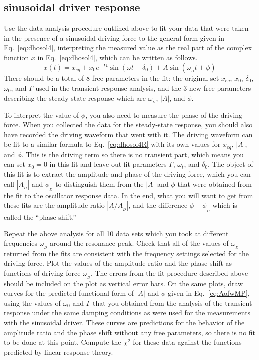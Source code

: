 \documentclass{revtex4}
\begin{document}
\subsection{sinusoidal driver response}

Use the data analysis procedure outlined above to fit your data that
were taken in the presence of a sinusoidal driving force to the general
form given in Eq.~\ref{eq:dhosol4}, interpreting the measured value as the
real part of the complex function $x$ in Eq.~\ref{eq:dhosol4}, which can
be written as follows.
\begin{equation}
x(t) = x_{eq} + x_0 e^{-\Gamma t} \sin(\omega t + \delta_0) 
              + A \sin(\omega_{_D} t + \phi)
\label{eq:dhosol4R}
\end{equation}
There should be a total of 8 free parameters in the fit: the original
set $x_{eq}$, $x_0$, $\delta_0$, $\omega_0$, and $\Gamma$ used in the
transient response analysis, and the 3 new free parameters describing
the steady-state response which are $\omega_{_D}$, $|A|$, and $\phi$.

To interpret the value of $\phi$, you also need to measure the phase
of the driving force. When you collected the data for the steady-state
response, you should also have recorded the driving waveform that went
with it. The driving waveform can be fit to a similar formula to
Eq.~\ref{eq:dhosol4R} with its own values for $x_{eq}$, $|A|$, and $\phi$.
This is the driving term so there is no transient part, which means
you can set $x_0=0$ in this fit and leave out fit parameters $\Gamma$,
$\omega_t$, and $\delta_0$.  The object of this fit is to extract the 
amplitude and phase of the driving force, which you can call $|A_{_D}|$
and $\phi_{_D}$ to distinguish them from the $|A|$ and $\phi$ that were
obtained from the fit to the oscillator response data. In the end,
what you will want to get from these fits are the amplitude ratio
$|A/A_{_D}|$, and the difference $\phi - \phi_{_D}$ which is called
the ``phase shift.''

Repeat the above analysis for all 10 data sets which you took at different
frequencies $\omega_{_D}$ around the resonance peak.  Check that all of
the values of $\omega_{_D}$ returned from the fits are consistent with the
frequency settings selected for the driving force.  Plot the values of
the amplitude ratio and the phase shift as functions of driving force
$\omega_{_D}$.  The errors from the fit procedure described above should be
included on the plot as vertical error bars.  On the same plots, draw curves
for the predicted functional form of $|A|$ and $\phi$ given in
Eq.~\ref{eq:AofwMP}, using the values of $\omega_0$ and $\Gamma$
that you obtained from the analysis of the transient response under
the same damping conditions as were used
for the measurements with the sinusoidal driver.  These curves are 
predictions for the behavior of the amplitude ratio and the phase shift
without any free parameters, so there is no fit to be done at this point.
Compute the $\chi^2$ for these data against the functions predicted by
linear response theory.
\end{document}
